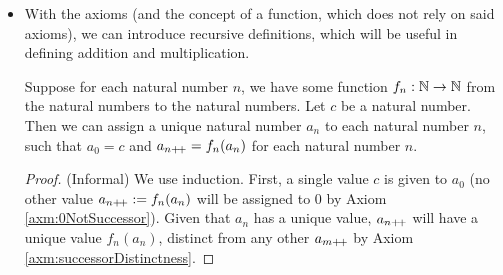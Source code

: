 \documentclass[../main.tex]{subfiles}
\begin{document}
\begin{itemize}
\begin{itemize}
        \item {}
    \end{itemize}
    \item With the axioms (and the concept of a function, which does not rely on said axioms), we can introduce recursive definitions, which will be useful in defining addition and multiplication.
    \begin{prop}
        Suppose for each natural number $n$, we have some function $f_n:\mathbb{N}\to\mathbb{N}$ from the natural numbers to the natural numbers. Let $c$ be a natural number. Then we can assign a unique natural number $a_n$ to each natural number $n$, such that $a_0=c$ and $a_{n{+\!+}}=f_n(a_n)$ for each natural number $n$.
        \begin{proof}
            (Informal) We use induction. First, a single value $c$ is given to $a_0$ (no other value $a_{n{+\!+}}:=f_n(a_n)$ will be assigned to 0 by Axiom \ref{axm:0NotSuccessor}). Given that $a_n$ has a unique value, $a_{n{+\!+}}$ will have a unique value $f_n(a_n)$, distinct from any other $a_{m{+\!+}}$ by Axiom \ref{axm:successorDistinctness}.
        \end{proof}
    \end{prop}
\end{itemize}
\end{document}
